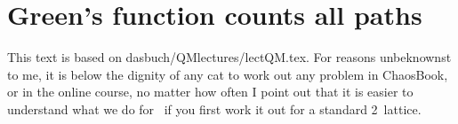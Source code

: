 
\section{Green's function counts all paths}
\label{s-lattProp}

This text is based on
 {dasbuch/QMlectures/lectQM.tex}.
For reasons unbeknownst to me, it is below the dignity of any cat to work out
any problem in Chaos\-Book, or in the online course, no matter how often I
point out that it is easier to understand what we do for \catlatt\ if you
first work it out for a standard 2\dmn\ lattice.


